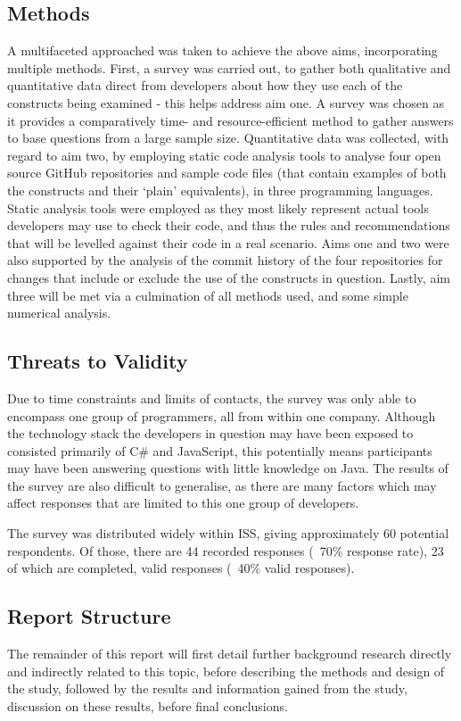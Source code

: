 \documentclass{article}
\begin{document}
    \subsection{Methods}
        A multifaceted approached was taken to achieve the above aims, incorporating multiple methods. First, a survey was carried out, to gather both qualitative and quantitative data direct from developers about how they use each of the constructs being examined - this helps address aim one. A survey was chosen as it provides a comparatively time- and resource-efficient method to gather answers to base questions from a large sample size.
        Quantitative data was collected, with regard to aim two, by employing static code analysis tools to analyse four open source GitHub repositories and sample code files (that contain examples of both the constructs and their `plain' equivalents), in three programming languages. Static analysis tools were employed as they most likely represent actual tools developers may use to check their code, and thus the rules and recommendations that will be levelled against their code in a real scenario.
        Aims one and two were also supported by the analysis of the commit history of the four repositories for changes that include or exclude the use of the constructs in question. Lastly, aim three will be met via a culmination of all methods used, and some simple numerical analysis.

    \subsection{Threats to Validity}
        Due to time constraints and limits of contacts, the survey was only able to encompass one group of programmers, all from within one company. Although the technology stack the developers in question may have been exposed to consisted primarily of C\# and JavaScript, this potentially means participants may have been answering questions with little knowledge on Java. The results of the survey are also difficult to generalise, as there are many factors which may affect responses that are limited to this one group of developers.

        The survey was distributed widely within ISS, giving approximately 60 potential respondents. Of those, there are 44 recorded responses  (~70\% response rate), 23 of which are completed, valid responses (~40\% valid responses).
    \subsection{Report Structure}
        The remainder of this report will first detail further background research directly and indirectly related to this topic, before describing the methods and design of the study, followed by the results and information gained from the study, discussion on these results, before final conclusions.
\newpage
\end{document}
